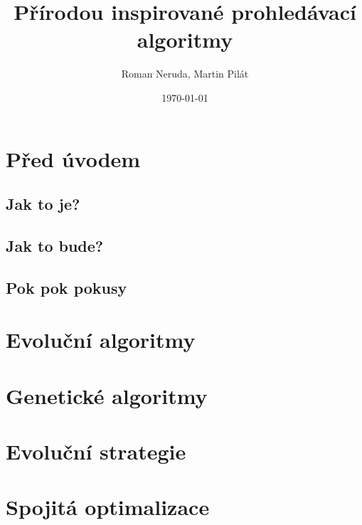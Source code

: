 \documentclass[a4paper,nofonts,nohyper,justified,colorinlistoftodos,hidelinks]{tufte-book}
\title{Přírodou inspirované prohledávací algoritmy}
\author{Roman Neruda, Martin Pilát}
\date{\today}
\begin{document}
\maketitle

\mainmatter

\chapter{Před úvodem}
\section{Jak to je?}

\section{Jak to bude?}
\section{Pok pok pokusy}


\chapter{Evoluční algoritmy}


\chapter{Genetické algoritmy}


\chapter{Evoluční strategie}

\chapter{Spojitá optimalizace}


\backmatter

\setcounter{tocdepth}{2}
\tableofcontents
\listoffigures
\listoftables
\listofalgorithms 
\printindex
\listoftodos

\nocite{*}


\end{document}
